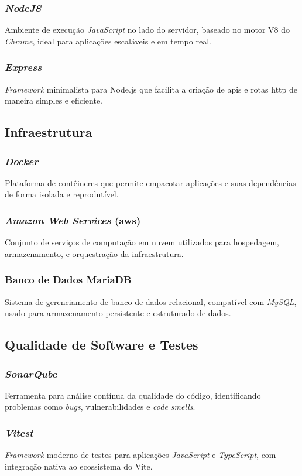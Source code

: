 \subsubsection{\emph{NodeJS}} 
Ambiente de execução \emph{JavaScript} no lado do servidor, baseado no motor V8 do \emph{Chrome}, ideal para aplicações escaláveis e em tempo real.

\subsubsection{\emph{Express}} 
\emph{Framework} minimalista para Node.js que facilita a criação de \gls{api}s e rotas \gls{http} de maneira simples e eficiente.

\subsection{Infraestrutura} 

\subsubsection{\emph{Docker}}
Plataforma de contêineres que permite empacotar aplicações e suas dependências de forma isolada e reprodutível.

\subsubsection{\emph{Amazon Web Services} (\gls{aws})} 
Conjunto de serviços de computação em nuvem utilizados para hospedagem, armazenamento, e orquestração da infraestrutura.

\subsubsection{Banco de Dados MariaDB}
Sistema de gerenciamento de banco de dados relacional, compatível com \emph{MySQL}, usado para armazenamento persistente e estruturado de dados.

\subsection{Qualidade de Software e Testes} 

\subsubsection{\emph{SonarQube}} 
Ferramenta para análise contínua da qualidade do código, identificando problemas como \emph{bugs}, vulnerabilidades e \emph{code smells}.

\subsubsection{\emph{Vitest}}
\emph{Framework} moderno de testes para aplicações \emph{JavaScript} e \emph{TypeScript}, com integração nativa ao ecossistema do Vite.
